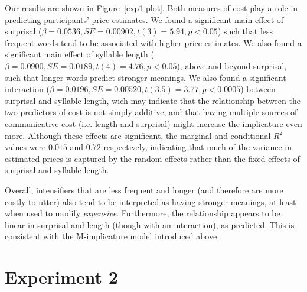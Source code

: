 \documentclass[10pt,letterpaper]{article}
\begin{document}
Our results are shown in Figure~\ref{exp1-plot}. Both measures of cost play a role in predicting participants' price estimates. We found a significant main effect of surprisal ($\beta=0.0536, SE=0.00902, t(3)=5.94, p<0.05$) such that less frequent words tend to be associated with higher price estimates. We also found a significant main effect of syllable length ($\beta=0.0900, SE=0.0189, t(4)=4.76, p<0.05$), above and beyond surprisal, such that longer words predict stronger meanings. We also found a significant interaction ($\beta=0.0196, SE=0.00520, t(3.5)=3.77, p<0.0005$) between surprisal and syllable length, wich may indicate that the relationship between the two predictors of cost is not simply additive, and that having multiple sources of communicative cost (i.e. length and surprisal) might increase the implicature even more. Although these effects are significant, the marginal and conditional $R^2$ values \cite{barton2014} were $0.015$ and $0.72$ respectively, indicating that much of the variance in estimated prices is captured by the random effects rather than the fixed effects of surprisal and syllable length.

Overall, intensifiers that are less frequent and longer (and therefore are more costly to utter) also tend to be interpreted as having stronger meanings, at least when used to modify \emph{expensive}. Furthermore, the relationship appears to be linear in surprisal and length (though with an interaction), as predicted.
This is consistent with the M-implicature model introduced above.

\section{Experiment 2}
\end{document}
